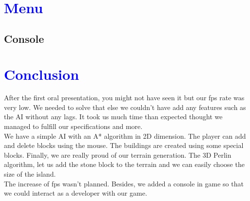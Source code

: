 \documentclass[article]{report}             %
\begin{document}
		\chapter{\textcolor{blue}{Menu}}
			\section{Console}
				

		\chapter{\textcolor{blue}{Conclusion}}
			After the first oral presentation, you might not have seen it but our fps rate was very low. We needed to solve that else we couldn't have add any features such as the AI without any lags.  It took us much time than expected thought we managed to fulfill our specifications and more. \\

We have a simple AI with an A* algorithm in 2D dimension. The player can add and delete blocks using the mouse. The buildings are created using some special blocks. Finally, we are really proud of our terrain generation. The 3D Perlin algorithm, let us add the stone block to the terrain and we can easily choose the size of the island.\\

The increase of fps wasn't planned. Besides, we added a console in game so that we could interact as a developer with our game.
\end{document}
